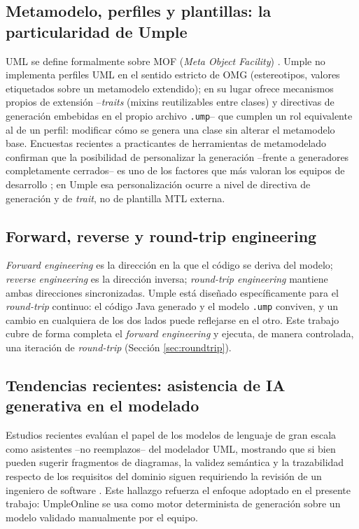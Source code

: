 \documentclass[11pt,a4paper]{article}
\begin{document}
\subsection{Metamodelo, perfiles y plantillas: la particularidad de Umple}
UML se define formalmente sobre MOF (\emph{Meta Object Facility}) \cite{omg2017uml}. Umple no implementa perfiles UML en el sentido estricto de OMG (estereotipos, valores etiquetados sobre un metamodelo extendido); en su lugar ofrece mecanismos propios de extensi\'on --\emph{traits} (mixins reutilizables entre clases) y directivas de generaci\'on embebidas en el propio archivo \texttt{.ump}-- que cumplen un rol equivalente al de un perfil: modificar c\'omo se genera una clase sin alterar el metamodelo base. Encuestas recientes a practicantes de herramientas de metamodelado confirman que la posibilidad de personalizar la generaci\'on --frente a generadores completamente cerrados-- es uno de los factores que m\'as valoran los equipos de desarrollo \cite{ozkaya2021}; en Umple esa personalizaci\'on ocurre a nivel de directiva de generaci\'on y de \emph{trait}, no de plantilla MTL externa.

\subsection{Forward, reverse y round-trip engineering}
\emph{Forward engineering} es la direcci\'on en la que el c\'odigo se deriva del modelo; \emph{reverse engineering} es la direcci\'on inversa; \emph{round-trip engineering} mantiene ambas direcciones sincronizadas. Umple est\'a dise\~nado espec\'ificamente para el \emph{round-trip} continuo: el c\'odigo Java generado y el modelo \texttt{.ump} conviven, y un cambio en cualquiera de los dos lados puede reflejarse en el otro. Este trabajo cubre de forma completa el \emph{forward engineering} y ejecuta, de manera controlada, una iteraci\'on de \emph{round-trip} (Secci\'on \ref{sec:roundtrip}).

\subsection{Tendencias recientes: asistencia de IA generativa en el modelado}
Estudios recientes eval\'uan el papel de los modelos de lenguaje de gran escala como asistentes --no reemplazos-- del modelador UML, mostrando que si bien pueden sugerir fragmentos de diagramas, la validez sem\'antica y la trazabilidad respecto de los requisitos del dominio siguen requiriendo la revisi\'on de un ingeniero de software \cite{camara2023}. Este hallazgo refuerza el enfoque adoptado en el presente trabajo: UmpleOnline se usa como motor determinista de generaci\'on sobre un modelo validado manualmente por el equipo.
\end{document}
